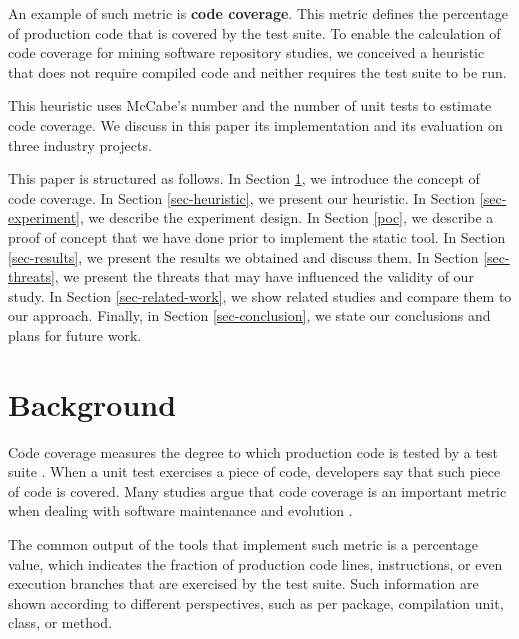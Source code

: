 \documentclass{sig-alternate}
\begin{document}
An example of such metric is \textbf{code coverage}. 
This metric defines the percentage of production code that is covered 
by the test suite. To enable the calculation of code coverage for mining software
repository studies, we conceived a heuristic that does not require compiled code
and neither requires the test suite to be run. 

This heuristic uses McCabe's number \cite{mccabe} and the number of unit tests to estimate code coverage. We discuss in this paper its implementation and its evaluation on three industry projects. 

This paper is structured as follows. In Section \ref{sec-code-coverage}, 
we introduce the concept of code coverage. In Section \ref{sec-heuristic}, 
we present our heuristic. In Section \ref{sec-experiment}, we describe the 
experiment design. In Section \ref{poc}, we describe a proof of concept that
we have done prior to implement the static tool. 
In Section \ref{sec-results}, we present the results we 
obtained and discuss them. In Section \ref{sec-threats}, 
we present the threats that may have influenced the validity of our study. 
In Section \ref{sec-related-work}, we show related studies and compare them 
to our approach. Finally, in Section \ref{sec-conclusion}, we state our 
conclusions and plans for future work.


\section{Background}
\label{sec-code-coverage}

Code coverage measures the degree to which production code is tested by a test suite \cite{code-coverage}. 
When a unit test exercises a piece of code, developers say that such piece
of code is covered. Many studies argue that code coverage is an important
metric when dealing with software maintenance and evolution \cite{sebastian} \cite{del-frate} \cite{mei-hwa}.

The common output of the tools that implement such metric is a percentage value, 
which indicates the fraction of production code lines, instructions, 
or even execution branches that are exercised by the test suite. Such information are shown according to different
perspectives, such as per package, compilation unit, class, or method. 
\end{document}
